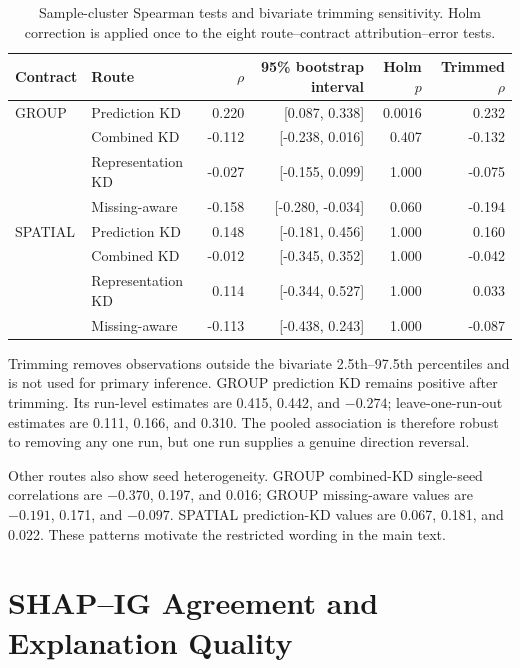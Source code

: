 \documentclass[runningheads]{venue/lncs/llncs}
\begin{document}
\begin{table}[h]
\centering
\caption{Sample-cluster Spearman tests and bivariate trimming sensitivity. Holm correction is applied once to the eight route--contract attribution--error tests.}
\small
\begin{tabular}{llrrrr}
\toprule
Contract & Route & $\rho$ & 95\% bootstrap interval & Holm $p$ & Trimmed $\rho$\\
\midrule
GROUP & Prediction KD & 0.220 & [0.087, 0.338] & 0.0016 & 0.232\\
& Combined KD & -0.112 & [-0.238, 0.016] & 0.407 & -0.132\\
& Representation KD & -0.027 & [-0.155, 0.099] & 1.000 & -0.075\\
& Missing-aware & -0.158 & [-0.280, -0.034] & 0.060 & -0.194\\
\midrule
SPATIAL & Prediction KD & 0.148 & [-0.181, 0.456] & 1.000 & 0.160\\
& Combined KD & -0.012 & [-0.345, 0.352] & 1.000 & -0.042\\
& Representation KD & 0.114 & [-0.344, 0.527] & 1.000 & 0.033\\
& Missing-aware & -0.113 & [-0.438, 0.243] & 1.000 & -0.087\\
\bottomrule
\end{tabular}
\end{table}

Trimming removes observations outside the bivariate 2.5th--97.5th percentiles and is not used for primary inference. GROUP prediction KD remains positive after trimming. Its run-level estimates are 0.415, 0.442, and $-0.274$; leave-one-run-out estimates are 0.111, 0.166, and 0.310. The pooled association is therefore robust to removing any one run, but one run supplies a genuine direction reversal.

Other routes also show seed heterogeneity. GROUP combined-KD single-seed correlations are $-0.370$, 0.197, and 0.016; GROUP missing-aware values are $-0.191$, 0.171, and $-0.097$. SPATIAL prediction-KD values are 0.067, 0.181, and 0.022. These patterns motivate the restricted wording in the main text.

\section{SHAP--IG Agreement and Explanation Quality}
\end{document}
